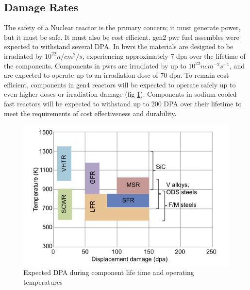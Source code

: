 \subsection{Damage Rates}
\FloatBarrier

The safety of a Nuclear reactor is the primary concern; it must generate power, but it must be safe.  It must also be cost efficient.  \acrshort{gen2} \acrshort{pwr} fuel assembles were expected to withstand several DPA\cite{genIVstrucmat}.  In \acrshort{bwr}s the materials are designed to be irradiated by $10^{22} n/cm^2/s$, experiencing approximately 7 \acrshort{dpa} over the lifetime of the components\cite{lightwaterallenbusby}.  Components in \acrshort{pwr}s are irradiated by up to $10^{22} n cm^{-2} s^{-1}$, and are expected to operate up to an irradiation dose of 70 dpa\cite{lightwaterallenbusby}.  To remain cost efficient, components in \acrshort{gen4} reactors will be expected to operate safely up to even higher doses or irradiation damage (fig \ref{fig:genIVdpa}).  Components in sodium-cooled fast reactors will be expected to withstand up to 200 DPA over their lifetime to meet the requirements of cost effectiveness and durability\cite{genIVstrucmat}.


\begin{figure}[h]
  \begin{center}
    \includegraphics[scale=0.55]{chapters/austenitic_steels_in_nuclear/images/dpagenIV.png}
    \caption{Expected DPA during component life time and operating temperatures\cite{genIVstrucmat}}
    \label{fig:genIVdpa}
  \end{center}
\end{figure}
\FloatBarrier

